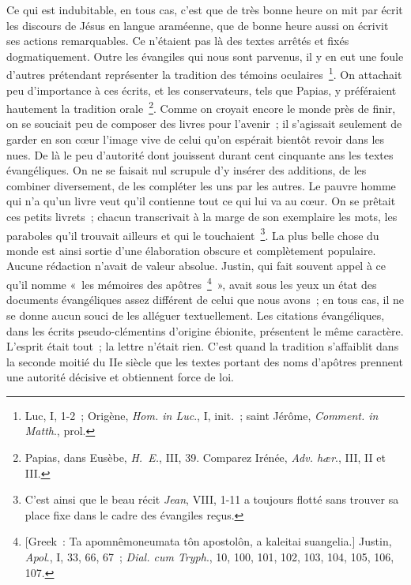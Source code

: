 \documentclass[french,twoside]{book} %
\begin{document}
Ce qui est indubitable, en tous cas, c’est que de très bonne heure on mit par écrit les discours de Jésus en langue araméenne, que de bonne heure aussi on écrivit ses actions remarquables. Ce n’étaient pas là des textes arrêtés et fixés dogmatiquement. Outre les évangiles qui nous sont parvenus, il y en eut une foule d’autres prétendant représenter la tradition des témoins oculaires \footnote{ Luc, I, 1-2 ; Origène, {\itshape Hom. in Luc}., I, init. ; saint Jérôme, {\itshape Comment. in Matth}., prol.}. On attachait peu d’importance à ces écrits, et les conservateurs, tels que Papias, y préféraient hautement la tradition orale \footnote{ Papias, dans Eusèbe, {\itshape H. E.}, III, 39. Comparez Irénée, {\itshape Adv. hær}., III, II et III.}. Comme on croyait encore le monde près de finir, on se souciait peu de composer des livres pour l’avenir ; il s’agissait seulement de garder en son cœur l’image vive de celui qu’on espérait bientôt revoir dans les nues. De là le peu d’autorité dont jouissent durant cent cinquante ans les textes évangéliques. On ne se faisait nul scrupule d’y insérer des additions, de les combiner diversement, de les compléter les uns par les autres. Le pauvre homme qui n’a qu’un livre veut qu’il contienne tout ce qui lui va au cœur. On se prêtait ces petits livrets ; chacun transcrivait à la marge de son exemplaire les mots, les paraboles qu’il trouvait ailleurs et qui le touchaient \footnote{ C’est ainsi que le beau récit {\itshape Jean}, VIII, 1-11 a toujours flotté sans trouver sa place fixe dans le cadre des évangiles reçus.}. La plus belle chose du monde est ainsi sortie d’une élaboration obscure et complètement populaire. Aucune rédaction n’avait de valeur absolue. Justin, qui fait souvent appel à ce qu’il nomme « les mémoires des apôtres \footnote{ [Greek : Ta apomnêmoneumata tôn apostolôn, a kaleitai suangelia.] Justin, {\itshape Apol}., I, 33, 66, 67 ; {\itshape Dial. cum Tryph}., 10, 100, 101, 102, 103, 104, 105, 106, 107.} », avait sous les yeux un état des documents évangéliques assez différent de celui que nous avons ; en tous cas, il ne se donne aucun souci de les alléguer textuellement. Les citations évangéliques, dans les écrits pseudo-clémentins d’origine ébionite, présentent le même caractère. L’esprit était tout ; la lettre n’était rien. C’est quand la tradition s’affaiblit dans la seconde moitié du IIe siècle que les textes portant des noms d’apôtres prennent une autorité décisive et obtiennent force de loi.\par
\end{document}

